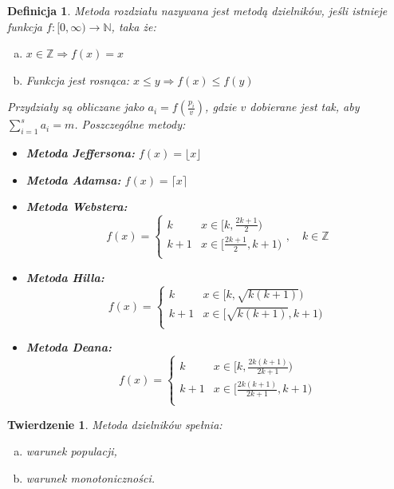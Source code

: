 \documentclass[12pt,a4paper]{article}
\theoremstyle{break}
\newtheorem{definition}{Definicja}[section]
\newtheorem{theorem}{Twierdzenie}[section]
\begin{document}
	\begin{definition}
		Metoda rozdziału nazywana jest metodą dzielników, jeśli istnieje funkcja 
		$f: [0, \infty) \to \mathbb{N}$, taka że:
		\begin{enumerate}[a)]
			\item $x \in \mathbb{Z} \Rightarrow f(x) = x$
			\item Funkcja jest rosnąca: $x \leq y \Rightarrow f(x) \leq f(y)$
		\end{enumerate}
		
		\noindent Przydziały są obliczane jako $a_i = f\left(\frac{p_i}{v}\right)$, gdzie $v$ dobierane jest tak, aby $\sum_{i=1}^s a_i = m$. Poszczególne metody:
		\begin{itemize}
			\item \textbf{Metoda Jeffersona:} $f(x) = \lfloor x \rfloor$
			\item \textbf{Metoda Adamsa:} $f(x) = \lceil x \rceil$
			\item \textbf{Metoda Webstera:}
			\[
			f(x) =
			\begin{cases} 
				k & x \in [k, \frac{2k+1}{2}) \\
				k+1 & x \in [\frac{2k+1}{2}, k+1) \\
			\end{cases}, \quad k \in \mathbb{Z}
			\]
			\item \textbf{Metoda Hilla:}
			\[
			f(x) =
			\begin{cases} 
				k & x \in [k, \sqrt{k(k+1)}) \\
				k+1 & x \in [\sqrt{k(k+1)}, k+1) \\
			\end{cases}
			\]
			\item \textbf{Metoda Deana:}
			\[
			f(x) =
			\begin{cases} 
				k & x \in [k, \frac{2k(k+1)}{2k+1}) \\
				k+1 & x \in [\frac{2k(k+1)}{2k+1}, k+1) \\
			\end{cases}
			\]
		\end{itemize}
	\end{definition}
	
	\begin{theorem}
		Metoda dzielników spełnia:
		\begin{enumerate}[a)]
			\item warunek populacji,
			\item warunek monotoniczności.
		\end{enumerate}
	\end{theorem}
	
\end{document}

